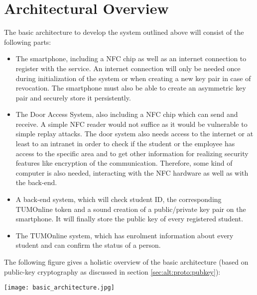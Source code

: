 \section{Architectural Overview}\label{sec:arch}

The basic architecture to develop the system outlined above will consist of the following parts:

\begin{itemize}
\item The smartphone, including a NFC chip as well as an internet connection to register with the service.
An internet connection will only be needed once during initialization of the system or when creating a new key pair in case of revocation.
The smartphone must also be able to create an asymmetric key pair and securely store it persistently.
\item The Door Access System, also including a NFC chip which can send and receive.
A simple NFC reader would not suffice as it would be vulnerable to simple replay attacks.
The door system also needs access to the internet or at least to an intranet in order to check if the student or the employee has access to the specific area and to get other information for realizing security features like encryption of the communication. Therefore, some kind of computer is also needed, interacting with the NFC hardware as well as with the back-end.
\item A back-end system, which will check student ID, the corresponding TUMOnline token and a sound creation of a public/private key pair on the smartphone. It will finally store the public key of every registered student.

\item The TUMOnline system, which has enrolment information about every student and can confirm the status of a person.
\end{itemize} 
%
The following figure gives a holistic overview of the basic architecture (based on public-key cryptography as discussed in section \ref{sec:alt:proto:pubkey}): \newline
 \begin{center}
	\texttt{[image: basic\_architecture.jpg]}
\end{center}


